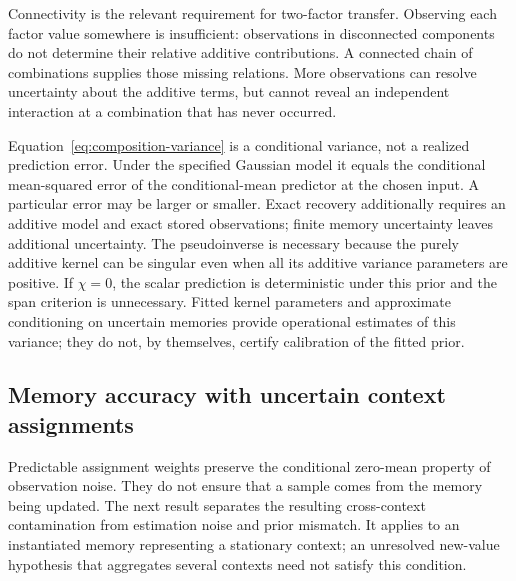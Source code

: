 Connectivity is the relevant requirement for two-factor transfer. Observing each factor value somewhere is insufficient: observations in disconnected components do not determine their relative additive contributions. A connected chain of combinations supplies those missing relations. More observations can resolve uncertainty about the additive terms, but cannot reveal an independent interaction at a combination that has never occurred.

Equation~\eqref{eq:composition-variance} is a conditional variance, not a realized prediction error. Under the specified Gaussian model it equals the conditional mean-squared error of the conditional-mean predictor at the chosen input. A particular error may be larger or smaller. Exact recovery additionally requires an additive model and exact stored observations; finite memory uncertainty leaves additional uncertainty. The pseudoinverse is necessary because the purely additive kernel can be singular even when all its additive variance parameters are positive. If $\chi=0$, the scalar prediction is deterministic under this prior and the span criterion is unnecessary. Fitted kernel parameters and approximate conditioning on uncertain memories provide operational estimates of this variance; they do not, by themselves, certify calibration of the fitted prior.

\subsection{Memory accuracy with uncertain context assignments}
\label{sec:confidence-theory}

Predictable assignment weights preserve the conditional zero-mean property of observation noise. They do not ensure that a sample comes from the memory being updated. The next result separates the resulting cross-context contamination from estimation noise and prior mismatch. It applies to an instantiated memory representing a stationary context; an unresolved new-value hypothesis that aggregates several contexts need not satisfy this condition.

